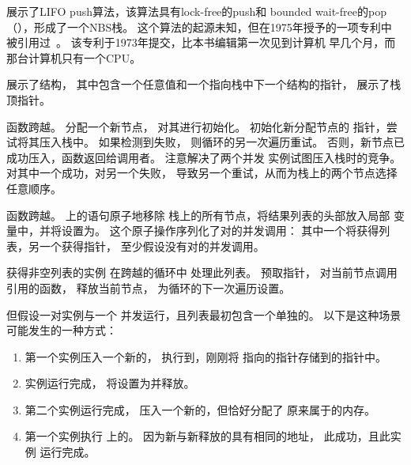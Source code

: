 \begin{fcvref}
展示了LIFO push算法，该算法具有lock-free的push和
bounded wait-free的pop（），形成了一个NBS栈。
这个算法的起源未知，但在1975年授予的一项专利中
被引用过~\cite{PaulJBrown1975LIFOpush}。
该专利于1973年提交，比本书编辑第一次见到计算机
早几个月，而那台计算机只有一个CPU\@。

\begin{listing}

\caption{NBS栈算法}
\label{lst:advsync:NBS Stack Algorithm}
\end{listing}

展示了结构，
其中包含一个任意值和一个指向栈中下一个结构的指针，
展示了栈顶指针。

函数跨越。
分配一个新节点，
对其进行初始化。
初始化新分配节点的
指针，尝试将其压入栈中。
如果检测到失败，
则循环的另一次遍历重试。
否则，新节点已成功压入，函数返回给调用者。
注意解决了两个并发
实例试图压入栈时的竞争。
对其中一个成功，对另一个失败，
导致另一个重试，从而为栈上的两个节点选择任意顺序。

函数跨越。
上的语句原子地移除
栈上的所有节点，将结果列表的头部放入局部
变量中，并将设置为。
这个原子操作序列化了对的并发调用：
其中一个将获得列表，另一个获得指针，
至少假设没有对的并发调用。

获得非空列表的实例
在跨越的循环中
处理此列表。
预取指针，
对当前节点调用引用的函数，
释放当前节点，
为循环的下一次遍历设置。

但假设一对实例与一个
并发运行，且列表最初包含一个单独的。
以下是这种场景可能发生的一种方式：

\begin{enumerate}
\item	第一个实例压入一个新的，
	执行到，刚刚将
	指向的指针存储到的指针中。
\item	{}实例运行完成，
	将设置为并释放。
\item	第二个实例运行完成，
	压入一个新的，但恰好分配了
	原来属于的内存。
\item	第一个实例执行
	上的。
	因为新与新释放的具有相同的地址，
	此成功，且此实例
	运行完成。
\end{enumerate}


\end{fcvref}
